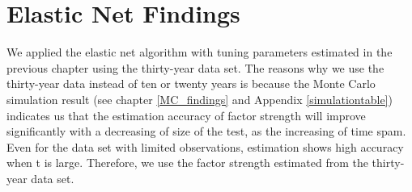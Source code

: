 \section{Elastic Net Findings}
We applied the elastic net algorithm with tuning parameters estimated in the previous chapter using the thirty-year data set.
The reasons why we use the thirty-year data instead of ten or twenty years is because the Monte Carlo simulation result (see chapter \ref{MC_findings} and Appendix \ref{simulationtable}) indicates us that the estimation accuracy of factor strength will improve significantly with a decreasing of size of the test, as the increasing of time spam.
Even for the data set with limited observations, estimation shows high accuracy when t is large.
Therefore, we use the factor strength estimated from the thirty-year data set.

